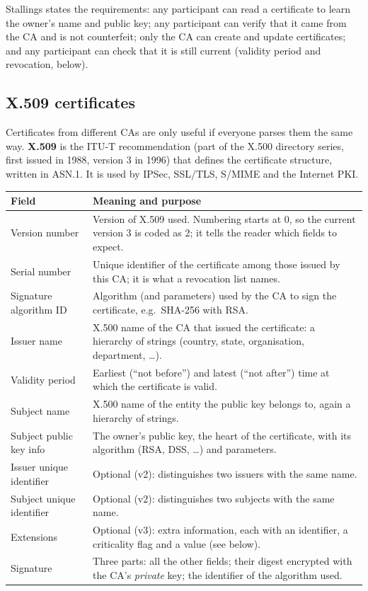 Stallings states the requirements: any participant can read a certificate to learn the owner's name and public key; any participant can verify that it came from the CA and is not counterfeit; only the CA can create and update certificates; and any participant can check that it is still current (validity period and revocation, below).

\subsection{X.509 certificates \hot\new}

Certificates from different CAs are only useful if everyone parses them the same way. \textbf{X.509} is the ITU-T recommendation (part of the X.500 directory series, first issued in 1988, version 3 in 1996) that defines the certificate structure, written in ASN.1. It is used by IPSec, SSL/TLS, S/MIME and the Internet PKI.
\begin{center}\small
\begin{tabularx}{\textwidth}{@{}l>{\raggedright\arraybackslash}X@{}}
\toprule
Field & Meaning and purpose\\
\midrule
Version number & Version of X.509 used. Numbering starts at 0, so the current version 3 is coded as 2; it tells the reader which fields to expect.\\
Serial number & Unique identifier of the certificate among those issued by this CA; it is what a revocation list names.\\
Signature algorithm ID & Algorithm (and parameters) used by the CA to sign the certificate, e.g.\ SHA-256 with RSA.\\
Issuer name & X.500 name of the CA that issued the certificate: a hierarchy of strings (country, state, organisation, department, \dots).\\
Validity period & Earliest (``not before'') and latest (``not after'') time at which the certificate is valid.\\
Subject name & X.500 name of the entity the public key belongs to, again a hierarchy of strings.\\
Subject public key info & The owner's public key, the heart of the certificate, with its algorithm (RSA, DSS, \dots) and parameters.\\
Issuer unique identifier & Optional (v2): distinguishes two issuers with the same name.\\
Subject unique identifier & Optional (v2): distinguishes two subjects with the same name.\\
Extensions & Optional (v3): extra information, each with an identifier, a criticality flag and a value (see below).\\
Signature & Three parts: all the other fields; their digest encrypted with the CA's \emph{private} key; the identifier of the algorithm used.\\
\bottomrule
\end{tabularx}
\end{center}
